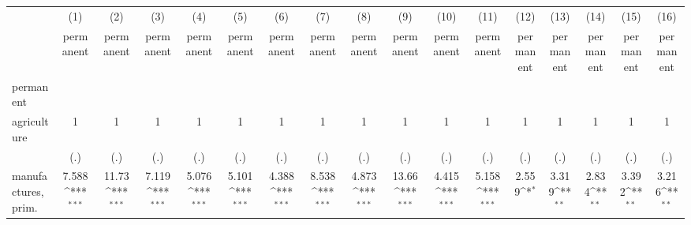 {
\def\sym#1{\ifmmode^{#1}\else\(^{#1}\)\fi}
\begin{tabular}{l*{16}{c}}
\hline\hline
                    &\multicolumn{1}{c}{(1)}&\multicolumn{1}{c}{(2)}&\multicolumn{1}{c}{(3)}&\multicolumn{1}{c}{(4)}&\multicolumn{1}{c}{(5)}&\multicolumn{1}{c}{(6)}&\multicolumn{1}{c}{(7)}&\multicolumn{1}{c}{(8)}&\multicolumn{1}{c}{(9)}&\multicolumn{1}{c}{(10)}&\multicolumn{1}{c}{(11)}&\multicolumn{1}{c}{(12)}&\multicolumn{1}{c}{(13)}&\multicolumn{1}{c}{(14)}&\multicolumn{1}{c}{(15)}&\multicolumn{1}{c}{(16)}\\
                    &\multicolumn{1}{c}{permanent}&\multicolumn{1}{c}{permanent}&\multicolumn{1}{c}{permanent}&\multicolumn{1}{c}{permanent}&\multicolumn{1}{c}{permanent}&\multicolumn{1}{c}{permanent}&\multicolumn{1}{c}{permanent}&\multicolumn{1}{c}{permanent}&\multicolumn{1}{c}{permanent}&\multicolumn{1}{c}{permanent}&\multicolumn{1}{c}{permanent}&\multicolumn{1}{c}{permanent}&\multicolumn{1}{c}{permanent}&\multicolumn{1}{c}{permanent}&\multicolumn{1}{c}{permanent}&\multicolumn{1}{c}{permanent}\\
\hline
permanent           &                     &                     &                     &                     &                     &                     &                     &                     &                     &                     &                     &                     &                     &                     &                     &                     \\
agriculture         &           1         &           1         &           1         &           1         &           1         &           1         &           1         &           1         &           1         &           1         &           1         &           1         &           1         &           1         &           1         &           1         \\
                    &         (.)         &         (.)         &         (.)         &         (.)         &         (.)         &         (.)         &         (.)         &         (.)         &         (.)         &         (.)         &         (.)         &         (.)         &         (.)         &         (.)         &         (.)         &         (.)         \\
[1em]
manufactures, prim. &       7.588\sym{***}&       11.73\sym{***}&       7.119\sym{***}&       5.076\sym{***}&       5.101\sym{***}&       4.388\sym{***}&       8.538\sym{***}&       4.873\sym{***}&       13.66\sym{***}&       4.415\sym{***}&       5.158\sym{***}&       2.559\sym{*}  &       3.319\sym{**} &       2.834\sym{**} &       3.392\sym{**} &       3.216\sym{**} \\

\end{tabular}}
